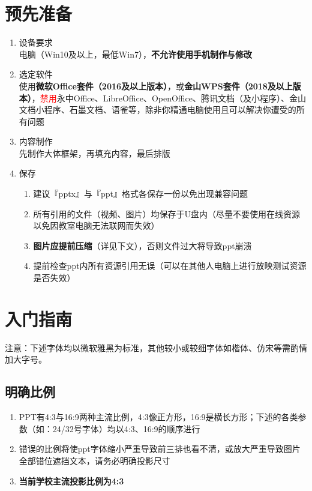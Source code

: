 \section[预先准备]{预先准备}
\begin{enumerate}
    \item 设备要求\\
          电脑（Win10及以上，最低Win7），\textbf{不允许使用手机制作与修改}
    \item 选定软件\\
          使用\textbf{微软Office套件（2016及以上版本）}，或\textbf{金山WPS套件（2018及以上版本）}，\textcolor{red}{禁用}永中Office、LibreOffice、OpenOffice、腾讯文档（及小程序）、金山文档小程序、石墨文档、语雀等，除非你精通电脑使用且可以解决你遭受的所有问题
    \item 内容制作\\
          先制作大体框架，再填充内容，最后排版
    \item 保存
          \begin{enumerate}
              \item 建议『pptx』与『ppt』格式各保存一份以免出现兼容问题
              \item 所有引用的文件（视频、图片）均保存于U盘内（尽量不要使用在线资源以免因教室电脑无法联网而失效）
              \item \textbf{图片应提前压缩}（详见下文），否则文件过大将导致ppt崩溃
              \item 提前检查ppt内所有资源引用无误（可以在其他人电脑上进行放映测试资源是否失效）
          \end{enumerate}
\end{enumerate}

\section[入门指南]{入门指南}
注意：下述字体均以微软雅黑为标准，其他较小或较细字体如楷体、仿宋等需酌情加大字号。

\subsection[明确比例]{明确比例}
\begin{enumerate}
    \item PPT有4:3与16:9两种主流比例，4:3像正方形，16:9是横长方形；下述的各类参数（如：24/32号字体）均以4:3、16:9的顺序进行
    \item 错误的比例将使ppt字体缩小严重导致前三排也看不清，或放大严重导致图片全部错位遮挡文本，请务必明确投影尺寸
    \item \textbf{当前学校主流投影比例为4:3}
\end{enumerate}

